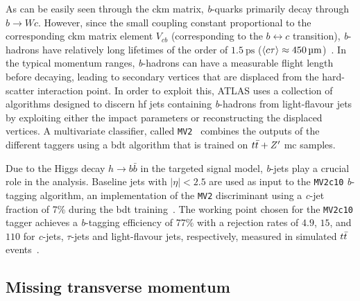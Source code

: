 As can be easily seen through the \gls{ckm} matrix, \textit{b}-quarks primarily decay through $b\rightarrow W c$. However, since the small coupling constant proportional to the corresponding \gls{ckm} matrix element $V_{cb}$ (corresponding to the $b \leftrightarrow c $ transition), \textit{b}-hadrons have relatively long lifetimes of the order of $\SI{1.5}{\pico\second}$ ($\braket{c\tau} \approx \SI{450}{\micro\meter}$)~\cite{pdg2020}. In the typical momentum ranges, \textit{b}-hadrons can have a measurable flight length before decaying, leading to secondary vertices that are displaced from the hard-scatter interaction point. In order to exploit this, ATLAS uses a collection of algorithms designed to discern \gls{hf} jets containing \textit{b}-hadrons from light-flavour jets by exploiting either the impact parameters or reconstructing the displaced vertices. A multivariate classifier, called \texttt{MV2}~\cite{ATL-PHYS-PUB-2017-013} combines the outputs of the different taggers using a \gls{bdt} algorithm that is trained on $t\bar{t} + Z'$ \gls{mc} samples. 

Due to the Higgs decay $h\rightarrow b\bar{b}$ in the targeted signal model, \textit{b}-jets play a crucial role in the analysis. Baseline jets with $\vert\eta\vert < 2.5$ are used as input to the \texttt{MV2c10} \textit{b}-tagging algorithm, an implementation of the \texttt{MV2} discriminant using a \textit{c}-jet fraction of 7\% during the \gls{bdt} training~\cite{FTAG-2018-01, PERF-2016-05}. The working point chosen for the \texttt{MV2c10} tagger achieves a \textit{b}-tagging efficiency of 77\% with a rejection rates of $4.9$, $15$, and $110$ for \textit{c}-jets, $\tau$-jets and light-flavour jets, respectively, measured in simulated $t\bar{t}$ events~\cite{FTAG-2018-01}.

\subsection{Missing transverse momentum}

